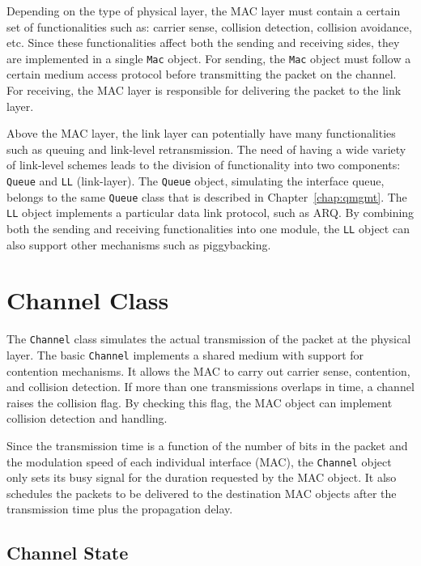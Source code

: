 Depending on the type of physical layer, the MAC layer must contain a
certain set of functionalities such as: carrier sense, collision
detection, collision avoidance, etc.  Since these functionalities affect
both the sending and receiving sides, they are implemented in a single
{\tt Mac} object.  For sending, the {\tt Mac} object must follow a certain
medium access protocol before transmitting the packet on the channel.
For receiving, the MAC layer is responsible for delivering the packet to
the link layer.

Above the MAC layer, the link layer can potentially have many
functionalities such as queuing and link-level retransmission.  The
need of having a wide variety of link-level schemes leads to the
division of functionality into two components: {\tt Queue} and
{\tt LL} (link-layer).  The {\tt Queue} object, simulating the
interface queue, belongs to the same {\tt Queue} class that is
described in Chapter~\ref{chap:qmgmt}.  The {\tt LL} object implements
a particular data link protocol, such as ARQ.  By combining both the
sending and receiving functionalities into one module, the {\tt LL}
object can also support other mechanisms such as piggybacking.

\section{Channel Class}
\label{sec:channel}

The {\tt Channel} class simulates the actual transmission of the packet
at the physical layer.  The basic {\tt Channel} implements a shared
medium with support for contention mechanisms.  It allows the MAC to
carry out carrier sense, contention, and collision detection.  If more
than one transmissions overlaps in time, a channel raises the collision
flag.  By checking this flag, the MAC object can implement collision detection
and handling.

Since the transmission time is a function of the number of bits in the
packet and the modulation speed of each individual interface (MAC), the
{\tt Channel} object only sets its busy signal for the duration
requested by the MAC object.  It also schedules the packets to be
delivered to the destination MAC objects after the transmission time
plus the propagation delay.

\subsection{Channel State}
\label{sec:channelstate}

